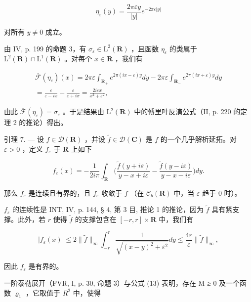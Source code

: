 \[
\eta_ {\varepsilon} (y) = \frac {2 \pi \varepsilon y}{| y |} e ^ {- 2 \pi \varepsilon | y |}
\]

对所有 \(y \neq 0\) 成立。

由 IV, p. 199 的命题 3，有 \(\sigma_{\varepsilon} \in \mathrm{L}^{2}(\mathbf{R})\) ，且函数 \(\eta_{\varepsilon}\) 的类属于 \(\mathrm{L}^{2}(\mathbf{R}) \cap \mathrm{L}^{1}(\mathbf{R})\) 。对每个 \(x \in \mathbf{R}\) ，我们有

\[
\begin{array}{r} \overline {{\mathcal {F}}} (\eta_ {\varepsilon}) (x) = 2 \pi \varepsilon \int_ {\mathbf {R} _ {+}} e ^ {2 \pi (i x - \varepsilon) y} d y - 2 \pi \varepsilon \int_ {\mathbf {R} _ {-}} e ^ {2 \pi (i x + \varepsilon) y} d y \\ = \frac {\varepsilon}{\varepsilon - i x} - \frac {\varepsilon}{\varepsilon + i x} = \frac {2 i \varepsilon x}{x ^ {2} + \varepsilon^ {2}}, \end{array}
\]

由此 \(\overline{\mathcal{F}}(\eta_{\varepsilon}) = \sigma_{\varepsilon}\) 。于是结果由 \(\mathrm{L}^2(\mathbf{R})\) 中的傅里叶反演公式（II, p. 220 的定理 2 的推论）得出。

引理 7. --- 设 \(f \in \mathcal{D}(\mathbf{R})\) ，并设 \(\widetilde{f} \in \mathcal{D}(\mathbf{C})\) 是 \(f\) 的一个几乎解析延拓。对 \(\varepsilon > 0\) ，定义 \(f_{\varepsilon}\) 于 \(\mathbf{R}\) 上如下

\[
f _ {\varepsilon} (x) = - \frac {1}{2 i \pi} \int_ {\mathbf {R}} \biggl (\frac {\widetilde {f} (y + i \varepsilon)}{y - x + i \varepsilon} - \frac {\widetilde {f} (y - i \varepsilon)}{y - x - i \varepsilon} \biggr) d y.
\]

那么 \(f_{\varepsilon}\) 是连续且有界的，且 \(f_{\varepsilon}\) 收敛于 \(f\) （在 \(\mathcal{C}_b(\mathbf{R})\) 中，当 \(\varepsilon\) 趋于 0 时）。

\(f_{\varepsilon}\) 的连续性是 INT, IV, p. 144, § 4, 第 3 目, 推论 1 的推论，因为 \(\widetilde{f}\) 具有紧支撑。此外，若 \(r\) 使得 \(\widetilde{f}\) 的支撑包含在 \([-r, r] \times \mathbf{R}\) 中，我们有

\[
| f _ {\varepsilon} (x) | \leqslant 2 \| \widetilde {f} \| _ {\infty} \int_ {- r} ^ {r} \frac {1}{\sqrt {(x - y) ^ {2} + \varepsilon^ {2}}} d y \leqslant \frac {4 r}{\varepsilon} \| \widetilde {f} \| _ {\infty},
\]

因此 \(f_{\varepsilon}\) 是有界的。

一阶泰勒展开（FVR, I, p. 30, 命题 3）与公式 (13) 表明，存在 M ≥ 0 及一个函数 \(\varrho_{1}\) ，它取值于 \(R^{2}\) 中，使得

